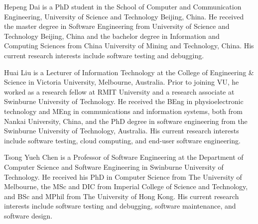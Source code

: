 \documentclass[10pt,journal,compsoc]{IEEEtran}
\begin{document}
\begin{IEEEbiography}{Hepeng Dai} is a PhD student in the School of Computer and Communication Engineering, University of Science and Technology Beijing, China. He received the master degree in Software Engineering from University of Science and Technology Beijing, China and the bachelor degree in Information and Computing Sciences from China University of Mining and Technology, China. His current research interests include software testing and debugging.
\end{IEEEbiography}

\begin{IEEEbiography}{Huai Liu} is a Lecturer of Information Technology at the College of Engineering \& Science in Victoria University, Melbourne, Australia. Prior to joining VU, he worked as a research fellow at RMIT University and a research associate at Swinburne University of Technology. He received the BEng in physioelectronic technology and MEng in communications and information systems, both from Nankai University, China, and the PhD degree in software engineering from the Swinburne University of Technology, Australia. His current research interests include software testing, cloud computing, and end-user software engineering.
\end{IEEEbiography}

\begin{IEEEbiography}{Tsong Yueh Chen} is a Professor of Software Engineering at the Department of Computer Science and Software Engineering in Swinburne University of Technology. He received his PhD in Computer Science from The University of Melbourne, the MSc and DIC from Imperial College of Science and Technology, and BSc and MPhil from The University of Hong Kong. His current research interests include software testing and debugging, software maintenance, and software design.
\end{IEEEbiography}
\end{document}
